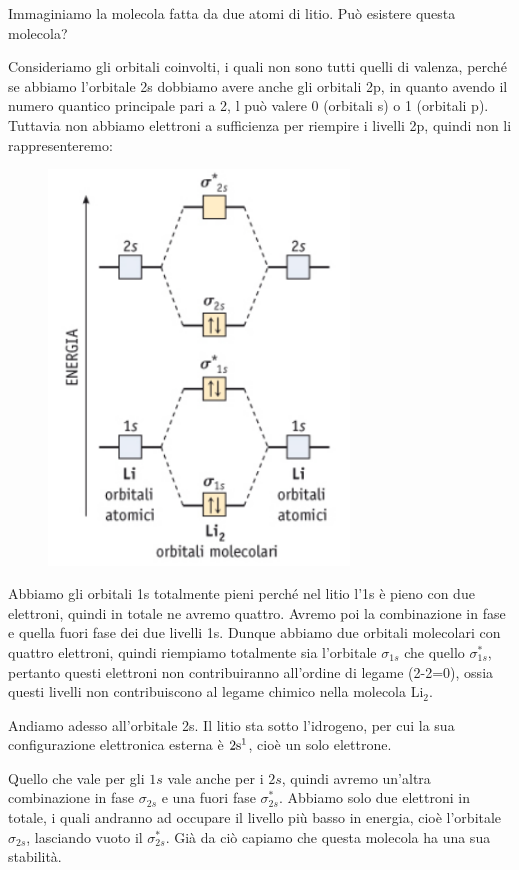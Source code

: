 Immaginiamo la molecola fatta da due atomi di litio. Può esistere questa molecola?

Consideriamo gli orbitali coinvolti, i quali non sono tutti quelli di valenza, perché se abbiamo l'orbitale 2s dobbiamo avere anche gli orbitali 2p, in quanto avendo il numero quantico principale pari a 2, l può valere 0 (orbitali s) o 1 (orbitali p). Tuttavia non abbiamo elettroni a sufficienza per riempire i livelli 2p, quindi non li rappresenteremo:

\begin{figure}[H]
    \centering
    \includegraphics[width=8cm]{immagini/orbitali_molecolari_Li_2.png}
\end{figure}

Abbiamo gli orbitali 1s totalmente pieni perché nel litio l'1s è pieno con due elettroni, quindi in totale ne avremo quattro. Avremo poi la combinazione in fase e quella fuori fase dei due livelli 1s. Dunque abbiamo due orbitali molecolari con quattro elettroni, quindi riempiamo totalmente sia l'orbitale $\sigma_{1s}$ che quello $\sigma^*_{1s}$, pertanto questi elettroni non contribuiranno all'ordine di legame (2-2=0), ossia questi livelli non contribuiscono al legame chimico nella molecola Li$_2$.

Andiamo adesso all'orbitale 2s. Il litio sta sotto l'idrogeno, per cui la sua configurazione elettronica esterna è $\rm 2s^1$, cioè un solo elettrone.
    
Quello che vale per gli $1s$ vale anche per i $2s$, quindi avremo un'altra combinazione in fase $\sigma_{2s}$ e una fuori fase $\sigma_{2s}^*$. Abbiamo solo due elettroni in totale, i quali andranno ad occupare il livello più basso in energia, cioè l'orbitale $\sigma_{2s}$, lasciando vuoto il $\sigma_{2s}^*$. Già da ciò capiamo che questa molecola ha una sua stabilità.

